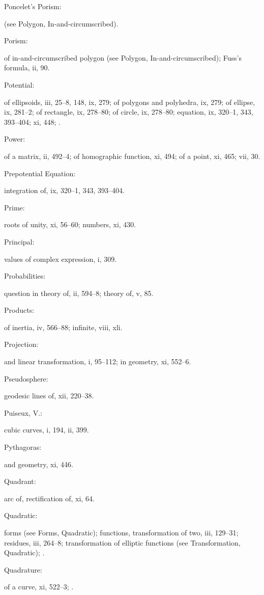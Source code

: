 \documentclass[11pt,a4paper]{book}
\providecommand{\V}[1]{#1}
\providecommand{\IndexEntry}[2]{#1\dotfill #2\par}
\begin{document}
\IndexEntry{Poncelet's Porism}: (see Polygon, In-and-circumscribed).

\IndexEntry{Porism}: of in-and-circumscribed polygon (see Polygon, In-and-circumscribed); Fuss's formula, \V{ii}, 90.

\IndexEntry{Potential}: of ellipsoids, \V{iii}, 25--8, 148, \V{ix}, 279; of polygons and polyhedra, \V{ix}, 279; of ellipse, \V{ix}, 281--2; of rectangle, \V{ix}, 278--80; of circle, \V{ix}, 278--80; equation, \V{ix}, 320--1, 343, 393--404; \V{xi}, 448; .

\IndexEntry{Power}: of a matrix, \V{ii}, 492--4; of homographic function, \V{xi}, 494; of a point, \V{xi}, 465; \V{vii}, 30.

\IndexEntry{Prepotential Equation}: integration of, \V{ix}, 320--1, 343, 393--404.

\IndexEntry{Prime}: roots of unity, \V{xi}, 56--60; numbers, \V{xi}, 430.

\IndexEntry{Principal}: values of complex expression, \V{i}, 309.

\IndexEntry{Probabilities}: question in theory of, \V{ii}, 594--8; theory of, \V{v}, 85.

\IndexEntry{Products}: of inertia, \V{iv}, 566--88; infinite, \V{viii}, xli.

\IndexEntry{Projection}: and linear transformation, \V{i}, 95--112; in geometry, \V{xi}, 552--6.

\IndexEntry{Pseudosphere}: geodesic lines of, \V{xii}, 220--38.

\IndexEntry{Puiseux, V.}: cubic curves, \V{i}, 194, \V{ii}, 399.

\newpage

\setcounter{page}{119}

\IndexEntry{Pythagoras}: and geometry, \V{xi}, 446.

\IndexEntry{Quadrant}: arc of, rectification of, \V{xi}, 64.

\IndexEntry{Quadratic}: forms (see Forms, Quadratic); functions, transformation of two, \V{iii}, 129--31; residues, \V{iii}, 264--8; transformation of elliptic functions (see Transformation, Quadratic); .

\IndexEntry{Quadrature}: of a curve, \V{xi}, 522--3; .
\end{document}
